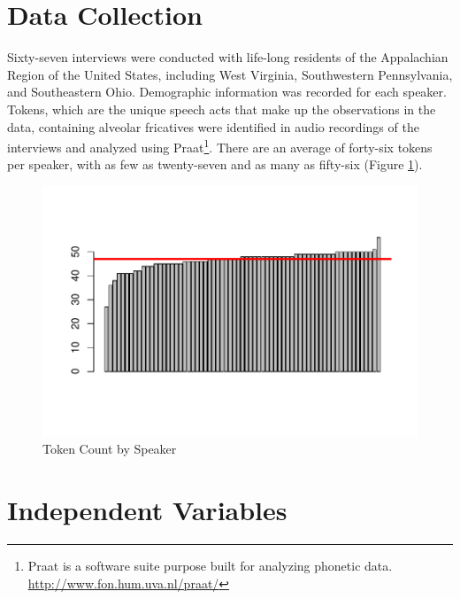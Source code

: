 \documentclass[a4paper]{article}
\begin{document}
\section*{Data Collection}
Sixty-seven interviews were conducted with life-long residents of
the Appalachian Region of the United States, including West Virginia,
Southwestern Pennsylvania, and Southeastern Ohio.  Demographic
information was recorded for each speaker.  Tokens, which are
the unique speech acts that make up the observations in the data,
containing alveolar fricatives were identified in audio recordings of the
interviews and analyzed using Praat\footnote{
  Praat is a software suite purpose built for analyzing phonetic data.\\
  \url{http://www.fon.hum.uva.nl/praat/}
}.  There are an average of forty-six tokens per speaker, with as few
as twenty-seven and as many as fifty-six (Figure \ref{fig:token_count}).
\vspace{-30pt}
\begin{figure}[ht]
  \begin{center}
    \begin{minipage}[t]{0.8\linewidth}
      \begin{center}
\includegraphics{prelim-003}
      \end{center}
    \end{minipage}
  \end{center}
  \vspace{-60pt}
  \caption{Token Count by Speaker}
  \label{fig:token_count}
\end{figure}
\section*{Independent Variables}
\end{document}
